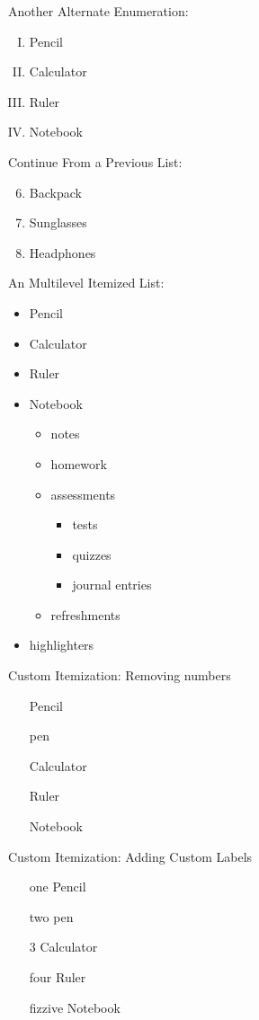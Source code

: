 \documentclass[11pt]{article}
\begin{document}
\vspace{1cm}

Another Alternate Enumeration:
\begin{enumerate}[I.] %
    \item Pencil
    \item Calculator
    \item Ruler
    \item Notebook
\end{enumerate}

\vspace{1cm}

Continue From a Previous List:
\begin{enumerate} \setcounter{enumi}{5}
    \item Backpack
    \item Sunglasses
    \item Headphones
\end{enumerate}

\vspace{1cm}

An Multilevel Itemized List:
\begin{itemize}
    \item Pencil
    \item Calculator
    \item Ruler
    \item Notebook
    \begin{itemize}
        \item notes
        \item homework
        \item assessments
        \begin{itemize}
            \item tests
            \item quizzes
            \item journal entries
        \end{itemize}
        \item refreshments
    \end{itemize}
\item highlighters
\end{itemize}

\pagebreak

Custom Itemization: Removing numbers
\begin{enumerate}
    \item[] Pencil
    \item[] pen
    \item[] Calculator
    \item[] Ruler
    \item[] Notebook
\end{enumerate}

\vspace{1cm}

Custom Itemization: Adding Custom Labels
\begin{enumerate}
    \item[one] Pencil
    \item[two] pen
    \item[3] Calculator
    \item[four] Ruler
    \item[fizzive] Notebook
\end{enumerate}
\end{document}
